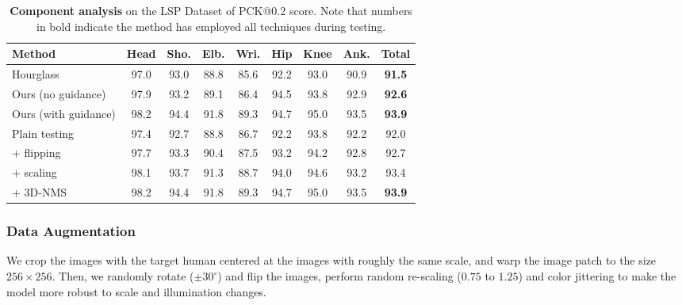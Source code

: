 \documentclass[journal ]{IEEEtran}
\begin{document}
\begin{table*}[t]
\small
	\tabcolsep=0.22cm
	\begin{center}
		\begin{tabular}{|l|c c c c c c c c|}
			\hline
			Method &Head &Sho. & Elb. & Wri. & Hip & Knee & Ank.  &Total \\
			\hline\hline
			Hourglass &97.0  & 93.0  & 88.8  & 85.6  & 92.2  & 93.0 & 90.9 & \textbf{91.5}  \\
			Ours (no guidance)  & 97.9  & 93.2  & 89.1  & 86.4  & 94.5  & 93.8 & 92.9 & \textbf{92.6} \\
			Ours (with guidance)  & 98.2  & 94.4  & 91.8  & 89.3  & 94.7  & 95.0 & 93.5 & \textbf{93.9} \\
			
			\hline
			Plain testing   
			& 97.4  & 92.7  & 88.8  & 86.7  & 92.2  & 93.8 & 92.2 & 92.0 \\
			\quad\quad + flipping  & 97.7  & 93.3  & 90.4  & 87.5  & 93.2  & 94.2 & 92.8 & 92.7 \\
			\quad\quad\quad + scaling  & 98.1  & 93.7  & 91.3  & 88.7  & 94.0  & 94.6 & 93.2 & 93.4  \\
			\quad\quad\quad\quad + 3D-NMS   & 98.2  & 94.4  & 91.8  & 89.3  & 94.7  & 95.0 & 93.5 & \textbf{93.9} \\
			\hline
		\end{tabular}
	\end{center}
	
	\caption{\textbf{Component analysis} on the LSP Dataset of PCK@0.2 score. Note that numbers in bold indicate the method has employed all techniques during testing.}
	\label{table:component-analysis}
\end{table*}

\subsubsection{Data Augmentation}
We crop the images with the target human centered at the images with roughly the same scale, and warp the image patch to the size $256 \times 256$. Then, we randomly rotate ($\pm 30^{\circ}$) and flip the images, perform random re-scaling ($0.75$ to $1.25$) and color jittering to make the model more robust to scale and illumination changes. 
\end{document}
